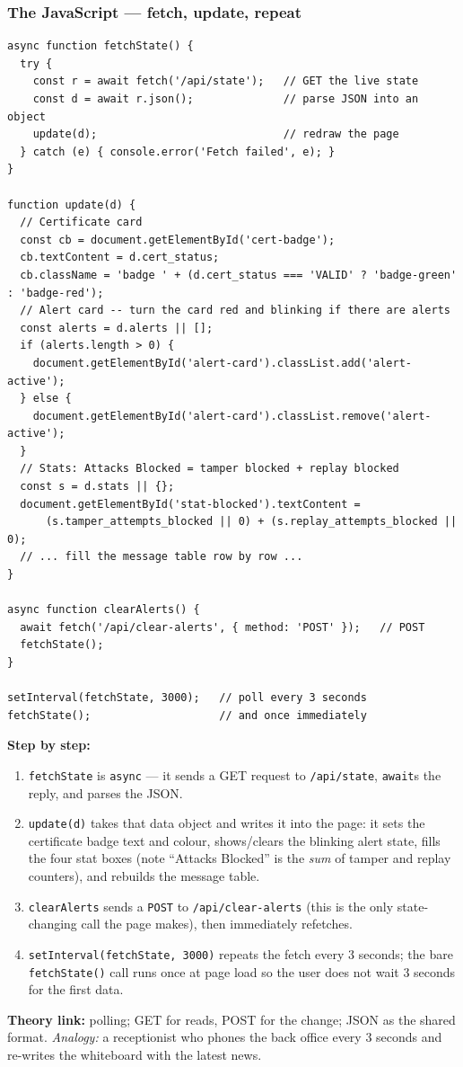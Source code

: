 \documentclass[11pt,a4paper]{report}
\begin{document}
\subsubsection*{The JavaScript --- fetch, update, repeat}
\begin{lstlisting}[style=web,caption={dashboard.html --- the polling JavaScript (core parts).}]
async function fetchState() {
  try {
    const r = await fetch('/api/state');   // GET the live state
    const d = await r.json();              // parse JSON into an object
    update(d);                             // redraw the page
  } catch (e) { console.error('Fetch failed', e); }
}

function update(d) {
  // Certificate card
  const cb = document.getElementById('cert-badge');
  cb.textContent = d.cert_status;
  cb.className = 'badge ' + (d.cert_status === 'VALID' ? 'badge-green' : 'badge-red');
  // Alert card -- turn the card red and blinking if there are alerts
  const alerts = d.alerts || [];
  if (alerts.length > 0) {
    document.getElementById('alert-card').classList.add('alert-active');
  } else {
    document.getElementById('alert-card').classList.remove('alert-active');
  }
  // Stats: Attacks Blocked = tamper blocked + replay blocked
  const s = d.stats || {};
  document.getElementById('stat-blocked').textContent =
      (s.tamper_attempts_blocked || 0) + (s.replay_attempts_blocked || 0);
  // ... fill the message table row by row ...
}

async function clearAlerts() {
  await fetch('/api/clear-alerts', { method: 'POST' });   // POST
  fetchState();
}

setInterval(fetchState, 3000);   // poll every 3 seconds
fetchState();                    // and once immediately
\end{lstlisting}
\textbf{Step by step:}
\begin{enumerate}
  \item \texttt{fetchState} is \texttt{async} --- it sends a GET request to
        \texttt{/api/state}, \texttt{await}s the reply, and parses the JSON.
  \item \texttt{update(d)} takes that data object and writes it into the page:
        it sets the certificate badge text and colour, shows/clears the blinking
        alert state, fills the four stat boxes (note ``Attacks Blocked'' is the
        \emph{sum} of tamper and replay counters), and rebuilds the message
        table.
  \item \texttt{clearAlerts} sends a \texttt{POST} to \texttt{/api/clear-alerts}
        (this is the only state-changing call the page makes), then immediately
        refetches.
  \item \texttt{setInterval(fetchState, 3000)} repeats the fetch every 3 seconds;
        the bare \texttt{fetchState()} call runs once at page load so the user
        does not wait 3 seconds for the first data.
\end{enumerate}
\textbf{Theory link:} polling; GET for reads, POST for the change; JSON as the
shared format. \emph{Analogy:} a receptionist who phones the back office every 3
seconds and re-writes the whiteboard with the latest news.
\end{document}
